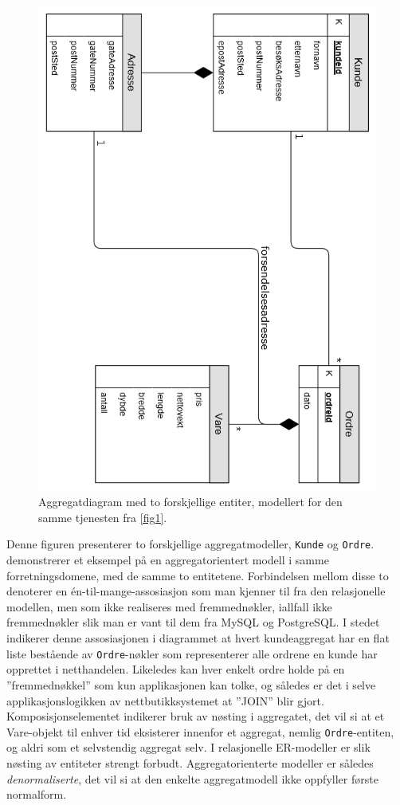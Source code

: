 \begin{figure}[!ht]
    \centering
    \includegraphics[scale=0.7]{fig/NettbutikkAggregatModell.png}
    \caption{Aggregatdiagram med to forskjellige entiter, modellert for den samme tjenesten fra \ref{fig1}.}
    \label{fig2}
\end{figure}

Denne figuren presenterer to forskjellige aggregatmodeller, \texttt{Kunde} og \texttt{Ordre}. \cite{sadalage2013} demonstrerer et eksempel på en aggregatorientert modell i samme forretningsdomene, med de samme to entitetene. Forbindelsen mellom disse to denoterer en én-til-mange-assosiasjon som man kjenner til fra den relasjonelle modellen, men som ikke realiseres med fremmednøkler, iallfall ikke fremmednøkler slik man er vant til dem fra MySQL og PostgreSQL. I stedet indikerer denne assosiasjonen i diagrammet at hvert kundeaggregat har en flat liste bestående av \texttt{Ordre}-nøkler som representerer alle ordrene en kunde har opprettet i netthandelen. Likeledes kan hver enkelt ordre holde på en ''fremmednøkkel'' som kun applikasjonen kan tolke, og således er det i selve applikasjonslogikken av nettbutikksystemet at ''JOIN'' blir gjort. Komposisjonselementet indikerer bruk av nøsting i aggregatet, det vil si at et Vare-objekt til enhver tid eksisterer innenfor et aggregat, nemlig \texttt{Ordre}-entiten, og aldri som et selvstendig aggregat selv. I relasjonelle ER-modeller er slik nøsting av entiteter strengt forbudt. Aggregatorienterte modeller er således \emph{denormaliserte}, det vil si at den enkelte aggregatmodell ikke oppfyller første normalform.

